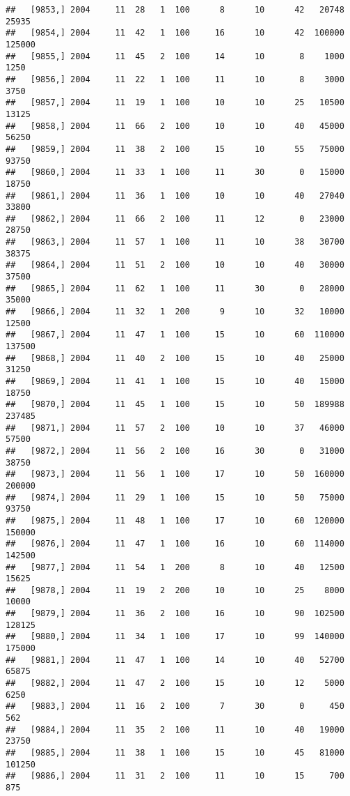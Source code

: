\documentclass{article}\usepackage[]{graphicx}\usepackage[]{color}
\makeatletter
\newenvironment{kframe}{%
 \def\at@end@of@kframe{}%
 \ifinner\ifhmode%
  \def\at@end@of@kframe{\end{minipage}}%
  \begin{minipage}{\columnwidth}%
 \fi\fi%
 \def\FrameCommand##1{\hskip\@totalleftmargin \hskip-\fboxsep
 \colorbox{shadecolor}{##1}\hskip-\fboxsep
     \hskip-\linewidth \hskip-\@totalleftmargin \hskip\columnwidth}%
 \MakeFramed {\advance\hsize-\width
   \@totalleftmargin\z@ \linewidth\hsize
   \@setminipage}}%
 {\par\unskip\endMakeFramed%
 \at@end@of@kframe}
\newenvironment{knitrout}{}{} %
\makeatother
\begin{document}
\begin{knitrout}
\begin{kframe}
\begin{verbatim}
##   [9853,] 2004     11  28   1  100      8      10      42   20748   25935
##   [9854,] 2004     11  42   1  100     16      10      42  100000  125000
##   [9855,] 2004     11  45   2  100     14      10       8    1000    1250
##   [9856,] 2004     11  22   1  100     11      10       8    3000    3750
##   [9857,] 2004     11  19   1  100     10      10      25   10500   13125
##   [9858,] 2004     11  66   2  100     10      10      40   45000   56250
##   [9859,] 2004     11  38   2  100     15      10      55   75000   93750
##   [9860,] 2004     11  33   1  100     11      30       0   15000   18750
##   [9861,] 2004     11  36   1  100     10      10      40   27040   33800
##   [9862,] 2004     11  66   2  100     11      12       0   23000   28750
##   [9863,] 2004     11  57   1  100     11      10      38   30700   38375
##   [9864,] 2004     11  51   2  100     10      10      40   30000   37500
##   [9865,] 2004     11  62   1  100     11      30       0   28000   35000
##   [9866,] 2004     11  32   1  200      9      10      32   10000   12500
##   [9867,] 2004     11  47   1  100     15      10      60  110000  137500
##   [9868,] 2004     11  40   2  100     15      10      40   25000   31250
##   [9869,] 2004     11  41   1  100     15      10      40   15000   18750
##   [9870,] 2004     11  45   1  100     15      10      50  189988  237485
##   [9871,] 2004     11  57   2  100     10      10      37   46000   57500
##   [9872,] 2004     11  56   2  100     16      30       0   31000   38750
##   [9873,] 2004     11  56   1  100     17      10      50  160000  200000
##   [9874,] 2004     11  29   1  100     15      10      50   75000   93750
##   [9875,] 2004     11  48   1  100     17      10      60  120000  150000
##   [9876,] 2004     11  47   1  100     16      10      60  114000  142500
##   [9877,] 2004     11  54   1  200      8      10      40   12500   15625
##   [9878,] 2004     11  19   2  200     10      10      25    8000   10000
##   [9879,] 2004     11  36   2  100     16      10      90  102500  128125
##   [9880,] 2004     11  34   1  100     17      10      99  140000  175000
##   [9881,] 2004     11  47   1  100     14      10      40   52700   65875
##   [9882,] 2004     11  47   2  100     15      10      12    5000    6250
##   [9883,] 2004     11  16   2  100      7      30       0     450     562
##   [9884,] 2004     11  35   2  100     11      10      40   19000   23750
##   [9885,] 2004     11  38   1  100     15      10      45   81000  101250
##   [9886,] 2004     11  31   2  100     11      10      15     700     875

\end{verbatim}
\end{kframe}
\end{knitrout}
\end{document}
